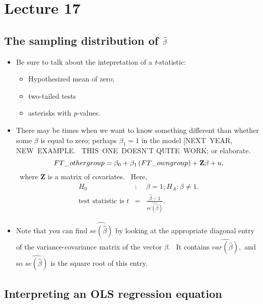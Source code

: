 \documentclass[11pt]{article}
\begin{document}
\section{Lecture 17}

\subsection{The sampling distribution of $\protect\widehat{\protect\beta }$}

\begin{itemize}
\item Be sure to talk about the intepretation of a \textit{t}-statistic:

\begin{itemize}
\item Hypothesized mean of zero;

\item two-tailed tests

\item asterisks with \textit{p}-values.
\end{itemize}

\item There may be times when we want to know something different than
whether some $\beta $ is equal to zero; perhaps $\beta _{1}=1$ in the model
[NEXT\ YEAR, NEW\ EXAMPLE. \ THIS\ ONE\ DOESN'T QUITE\ WORK; or elaborate.%
\begin{equation*}
FT\_othergroup=\beta _{0}+\beta _{1}\left( FT\_owngroup\right) +\mathbf{%
Z\beta }+u,
\end{equation*}%
\ where $\mathbf{Z}$ is a matrix of covariates. \ Here,%
\begin{eqnarray*}
H_{0} &:&\beta =1;H_{A}:\beta \neq 1. \\
\text{test statistic is }t &=&\frac{\widehat{\beta }-1}{\widehat{se\left( 
\widehat{\beta }\right) }}.
\end{eqnarray*}

\item Note that you can find $\widehat{se\left( \widehat{\beta }\right) }$
by looking at the appropriate diagonal entry of the variance-covariance
matrix of the vector $\widehat{\beta }.$ \ It contains $\widehat{var\left( 
\widehat{\beta }\right) },$ and so $\widehat{se\left( \widehat{\beta }%
\right) }$ is the square root of this entry.
\end{itemize}

\subsection{Interpreting an OLS regression equation}
\end{document}
